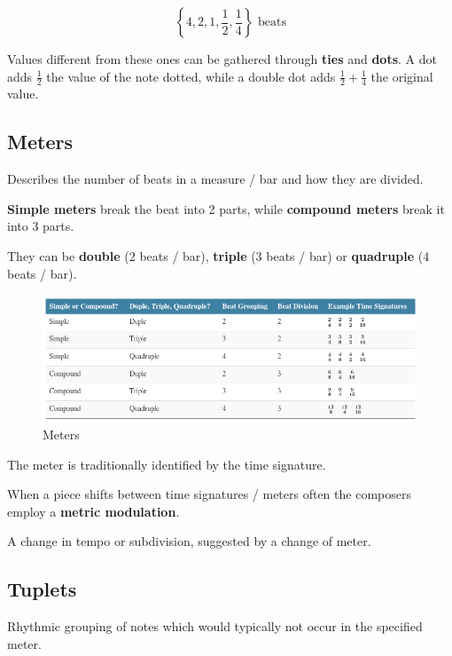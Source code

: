 $$\left\{4,2,1,\frac{1}{2}, \frac{1}{4}\right\} \text{ beats}$$

Values different from these ones can be gathered through \textbf{ties} and \textbf{dots}. A dot adds $\frac{1}{2}$ the value of the note dotted, while a double dot adds $\frac{1}{2} + \frac{1}{4}$ the original value.

\subsection{Meters}
\begin{definition}[Meter]
    Describes the number of beats in a measure / bar and how they are divided.
\end{definition}

\textbf{Simple meters} break the beat into 2 parts, while \textbf{compound meters} break it into 3 parts.

They can be \textbf{double} (2 beats / bar), \textbf{triple} (3 beats / bar) or \textbf{quadruple} (4 beats / bar).

\begin{figure}[h]
    \begin{center}
        \includegraphics[width=1\textwidth]{img/meters}
        \caption{Meters}
    \end{center}
\end{figure}

The meter is traditionally identified by the time signature.

When a piece shifts between time signatures / meters often the composers employ a \textbf{metric modulation}.

\begin{definition}
    A change in tempo or subdivision, suggested by a change of meter.
\end{definition}

\subsection{Tuplets}
\begin{definition}[Tuplet]
    Rhythmic grouping of notes which would typically not occur in the specified meter.
\end{definition}

